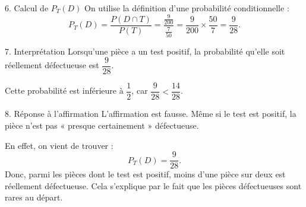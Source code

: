 \documentclass[11pt,a4paper]{article}
\begin{document}
\begin{correctionbox}{6. Calcul de $P_T(D)$}
On utilise la définition d'une probabilité conditionnelle :
\[
P_T(D)=\frac{P(D\cap T)}{P(T)}=\frac{\frac9{200}}{\frac7{50}}
=\frac9{200}\times\frac{50}{7}=\frac9{28}.
\]
\end{correctionbox}

\begin{correctionbox}{7. Interprétation}
Lorsqu'une pièce a un test positif, la probabilité qu'elle soit réellement défectueuse est $\dfrac9{28}$.

Cette probabilité est inférieure à $\dfrac12$, car $\dfrac9{28}<\dfrac{14}{28}$.
\end{correctionbox}

\begin{correctionbox}{8. Réponse à l'affirmation}
L'affirmation est fausse. Même si le test est positif, la pièce n'est pas « presque certainement » défectueuse.

En effet, on vient de trouver :
\[
P_T(D)=\frac9{28}.
\]
Donc, parmi les pièces dont le test est positif, moins d'une pièce sur deux est réellement défectueuse. Cela s'explique par le fait que les pièces défectueuses sont rares au départ.
\end{correctionbox}
\end{document}

